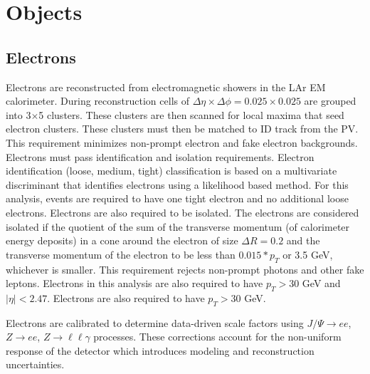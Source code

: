 \chapter{Objects}
\section{Electrons}
Electrons are reconstructed from electromagnetic showers in the LAr EM calorimeter. During reconstruction cells of $\Delta \eta \times \Delta \phi = 0.025 \times 0.025 $ are grouped into 3$\times$5 clusters. These clusters are then scanned for local maxima that seed electron clusters. These clusters must then be matched to ID track from the PV. This requirement minimizes non-prompt electron and fake electron backgrounds. Electrons must pass identification and isolation requirements. Electron identification (loose, medium, tight) classification is based on a multivariate discriminant that identifies electrons using a likelihood based method. For this analysis, events are required to have one tight electron and no additional loose electrons. Electrons are also required to be isolated. The electrons are considered isolated if the quotient of the sum of the transverse momentum (of calorimeter energy deposits) in a cone around the electron of size $\Delta R = 0.2$ and the transverse momentum of the electron to be less than $0.015*p_{T}$ or 3.5 GeV, whichever is smaller. This requirement rejects non-prompt photons and other fake leptons. Electrons in this analysis are also required to have $p_{T} > 30$ GeV and $|\eta| < 2.47$. Electrons are also required to have $p_{T} > 30$ GeV.

Electrons are calibrated to determine data-driven scale factors using $J/ \Psi \rightarrow ee$, $Z \rightarrow ee$, $Z \rightarrow \ell \ell \gamma$ processes. These corrections account for the  non-uniform response of the detector which introduces modeling and reconstruction uncertainties. 


